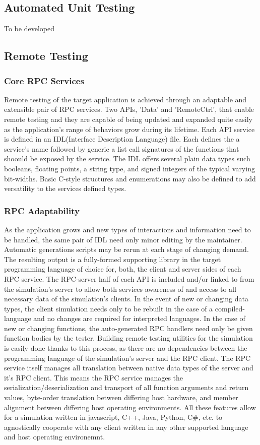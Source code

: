 \documentclass[conference]{IEEEtran}
\begin{document}
\subsection{Automated Unit Testing}

To be developed


\subsection{Remote Testing}

\subsubsection{Core RPC Services}Remote testing of the target application is achieved through an adaptable and extensible pair of RPC services. Two APIs, 'Data' and 'RemoteCtrl', that enable remote testing and they are capable of being updated and expanded quite easily as the application's range of behaviors grow during its lifetime. Each API service is defined in an IDL(Interface Description Language) file. Each defines the a service's name followed by generic a list call signatures of the functions that shoould be exposed by the service. The IDL offers several plain data types such booleans, floating points, a string type, and signed integers of the typical varying bit-widths. Basic C-style structures and enumerations may also be defined to add versatility to the services defined types.
\subsubsection{RPC Adaptability}As the application grows and new types of interactions and information need to be handled, the same pair of IDL need only minor editing by the maintainer. Automatic generations scripts may be rerun at each stage of changing demand. The resulting output is a fully-formed supporting library in the target programming language of choice for, both, the client and server sides of each RPC service. The RPC-server half of each API is included and/or linked to from the simulation's server to allow both services awareness of and access to all necessary data of the simulation's clients. In the event of new or changing data types, the client simulation needs only to be rebuilt in the case of a compiled-language and no changes are required for interpreted languages. In the case of new or changing functions, the auto-generated RPC handlers need only be given function bodies by the tester. Building remote testing utilities for the simulation is easily done thanks to this process, as there are no dependencies between the programming language of the simulation's server and the RPC client. The RPC service itself manages all translation between native data types of the server and it's RPC client. This means the RPC service manages the serialization/deserialization and transport of all function arguments and return values, byte-order translation between differing host hardware, and member alignment between differing host operating environments. All these features allow for a simulation written in javascript, C++, Java, Python, C\#, etc. to agnostically cooperate with any client written in any other supported language and host operating environemnt.
\end{document}
